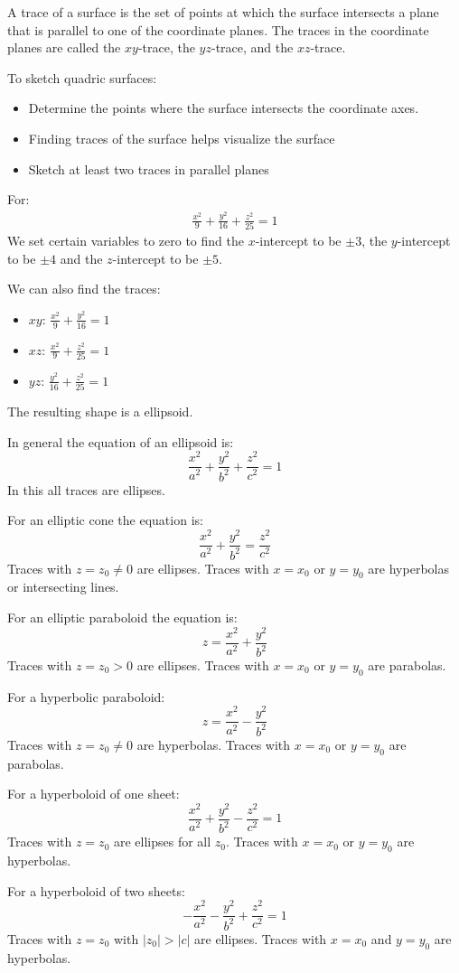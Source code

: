 \documentclass[../calc3.tex]{subfiles}
\begin{document}
A trace of a surface is the set of points at which the surface intersects a plane that is 
parallel to one of the coordinate planes. The traces in the coordinate planes are called the 
$xy$-trace, the $yz$-trace, and the $xz$-trace.

To sketch quadric surfaces:
\begin{itemize}
    \item Determine the points where the surface intersects the coordinate axes. 
    \item Finding traces of the surface helps visualize the surface
    \item Sketch at least two traces in parallel planes
\end{itemize}

\begin{example}
    For:
    \begin{align*}
        \frac{x^2}{9}+\frac{y^2}{16}+\frac{z^2}{25}=1
    \end{align*}
    We set certain variables to zero to find the $x$-intercept to be $\pm 3$, the $y$-intercept 
    to be $\pm 4$ and the $z$-intercept to be $\pm 5$.

    We can also find the traces:
    \begin{itemize}
        \item $xy$: $\frac{x^2}{9}+\frac{y^2}{16}=1$
        \item $xz$: $\frac{x^2}{9}+\frac{z^2}{25}=1$
        \item $yz$: $\frac{y^2}{16}+\frac{z^2}{25}=1$
    \end{itemize}

    The resulting shape is a ellipsoid.
\end{example}

In general the equation of an ellipsoid is:
\[\frac{x^2}{a^2}+\frac{y^2}{b^2}+\frac{z^2}{c^2}=1\]
In this all traces are ellipses.

For an elliptic cone the equation is:
\[\frac{x^2}{a^2}+\frac{y^2}{b^2}=\frac{z^2}{c^2}\]
Traces with $z = z_0 \neq 0$ are ellipses. Traces with $x=x_0$ or $y=y_0$ are hyperbolas or intersecting lines.

For an elliptic paraboloid the equation is:
\[z=\frac{x^2}{a^2}+\frac{y^2}{b^2}\]
Traces with $z=z_0>0$ are ellipses. Traces with $x=x_0$ or $y=y_0$ are parabolas.

For a hyperbolic paraboloid:
\[z=\frac{x^2}{a^2}-\frac{y^2}{b^2}\]
Traces with $z=z_0\neq 0$ are hyperbolas. Traces with $x=x_0$ or $y=y_0$ are parabolas.

For a hyperboloid of one sheet:
\[\frac{x^2}{a^2}+\frac{y^2}{b^2}-\frac{z^2}{c^2}=1\]
Traces with $z=z_0$ are ellipses for all $z_0$. Traces with $x=x_0$ or $y=y_0$ are hyperbolas.

For a hyperboloid of two sheets:
\[-\frac{x^2}{a^2}-\frac{y^2}{b^2}+\frac{z^2}{c^2}=1\]
Traces with $z=z_0$ with $|z_0|>|c|$ are ellipses. Traces with $x=x_0$ and $y=y_0$ are hyperbolas.
\end{document}

